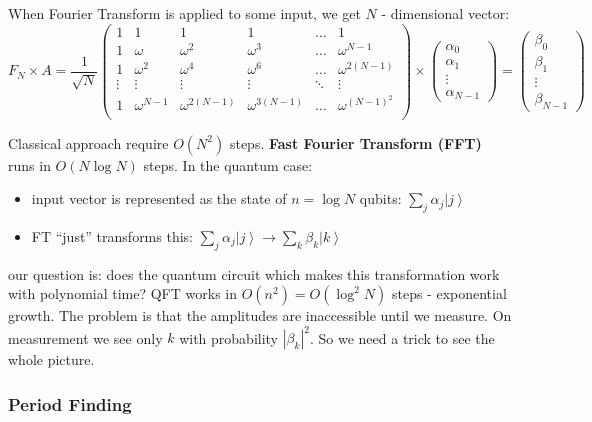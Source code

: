 \documentclass{scrartcl}
\newcommand{\ket}[1]{\left| #1 \right>} %
\begin{document}
When Fourier Transform is applied to some input, we get $N$ - dimensional
vector:
$$F_N \times A = \frac1{\sqrt N} \left(  
\begin{array}{cccccc}
  1 &  1&  1& 1& \dots & 1 \\
  1 &  \omega & \omega^2 & \omega^3 & \dots & \omega^{N-1} \\
  1 &  \omega^2 & \omega^4 & \omega^6 & \dots & \omega^{2(N-1)} \\
  \vdots & \vdots &  \vdots & \vdots & \ddots & \vdots \\
  1 &  \omega^{N-1} & \omega^{2(N-1)} & \omega^{3(N-1)} & \dots & \omega^{(N-1)^2} \\
\end{array}\right) \times
\begin{pmatrix} \alpha_0 \\ \alpha_1 \\ \vdots \\ \alpha_{N-1} \end{pmatrix} =
\begin{pmatrix} \beta_0 \\ \beta_1 \\ \vdots \\ \beta_{N-1} \end{pmatrix} $$

Classical approach require $O(N^2)$ steps. {\bf Fast Fourier Transform (FFT)}
runs in $O(N \log N)$ steps. In the quantum case:
\begin{itemize}
\item input vector is represented as the state of $n = \log N$ qubits: $\sum
  \limits_j \alpha_j \ket j$
\item FT ``just'' transforms this: $\sum \limits_j \alpha_j \ket j \to \sum
  \limits_k \beta_k \ket k$
\end{itemize}
our question is: does the quantum circuit which makes this transformation work
with polynomial time? QFT works in $O(n^2) = O(\log^2 N)$ steps - exponential
growth. The problem is that the amplitudes are inaccessible until we measure. On
measurement we see only $k$ with probability $|\beta_k|^2$. So we need a trick
to see the whole picture.

\subsubsection{Period Finding}
\label{sec:PeriodFinding}
\end{document}
